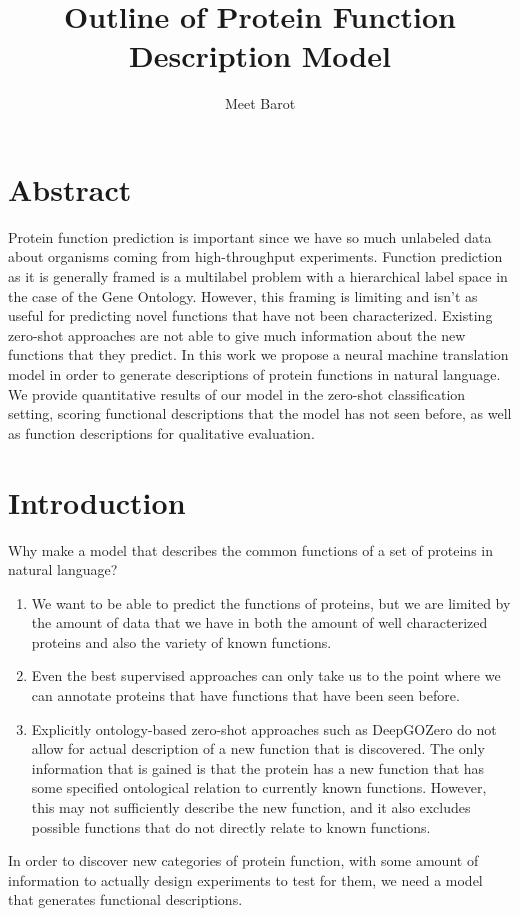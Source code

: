 \documentclass{specification}
\title{Outline of Protein Function Description Model}
\author{Meet Barot}
\begin{document}
\maketitle

\section{Abstract}
Protein function prediction is important since we have so much unlabeled data about organisms coming from high-throughput experiments. Function prediction as it is generally framed is a multilabel problem with a hierarchical label space in the case of the Gene Ontology. However, this framing is limiting and isn't as useful for predicting novel functions that have not been characterized. Existing zero-shot approaches are not able to give much information about the new functions that they predict. In this work we propose a neural machine translation model in order to generate descriptions of protein functions in natural language. We provide quantitative results of our model in the zero-shot classification setting, scoring functional descriptions that the model has not seen before, as well as function descriptions for qualitative evaluation.
\section{Introduction}
Why make a model that describes the common functions of a set of proteins in natural language?
\begin{enumerate}
    \item We want to be able to predict the functions of proteins, but we are limited by the amount of data that we have in both the amount of well characterized proteins and also the variety of known functions.
    \item Even the best supervised approaches can only take us to the point where we can annotate proteins that have functions that have been seen before.
    \item Explicitly ontology-based zero-shot approaches such as DeepGOZero \cite{DeepGOZero} do not allow for actual description of a new function that is discovered. The only information that is gained is that the protein has a new function that has some specified ontological relation to currently known functions. However, this may not sufficiently describe the new function, and it also excludes possible functions that do not directly relate to known functions.
\end{enumerate}
In order to discover new categories of protein function, with some amount of information to actually design experiments to test for them, we need a model that generates functional descriptions.
\end{document}
